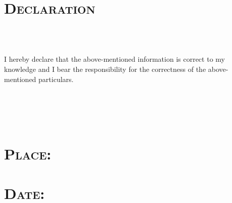 \begin{resume}
\dates{}
\begin{position}
\end{position}


\section{\textsc{Declaration}}

\begin{formatb}
  \\
  \body\\
\end{formatb}

I hereby declare that the above-mentioned information is
  correct to my knowledge and I bear the responsibility for the
  correctness of the above-mentioned particulars. \\\\\\\\\\

\section{\textsc{Place}:}

\section{\textsc{Date}:}
\begin{formatb}
  \\
  \body\\
\end{formatb}
\employer{}
\begin{position}
\end{position}



\end{resume}

